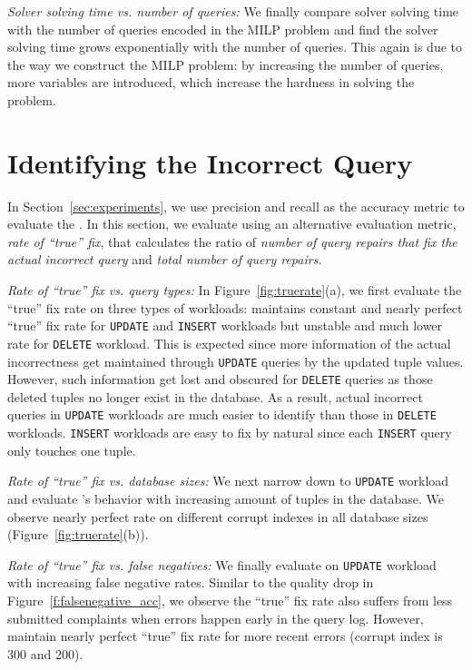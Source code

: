\smallskip
\emph{Solver solving time vs. number of queries: } We finally compare solver solving time with the number of queries encoded in the MILP problem and find the solver solving time grows exponentially with the number of queries. This again is due to the way we construct the MILP problem: by increasing the number of queries, more variables are introduced, which increase the hardness in solving the problem. 

\section{Identifying the Incorrect Query}
\label{app:index}
In Section~\ref{sec:experiments}, we use precision and recall as the accuracy metric to evaluate the \sys. In this section, we evaluate \sys using an alternative evaluation metric, \textit{rate of ``true'' fix}, that calculates the ratio of \textit{number of query repairs that fix the actual incorrect query} and \textit{total number of query repairs}. 

\smallskip
\emph{Rate of ``true'' fix vs. query types: } In Figure~\ref{fig:truerate}(a), we first evaluate the ``true'' fix rate on three types of workloads: \sys maintains constant and nearly perfect ``true'' fix rate for \texttt{UPDATE} and \texttt{INSERT} workloads but unstable and much lower rate for \texttt{DELETE} workload. This is expected since more information of the actual incorrectness get maintained through \texttt{UPDATE} queries by the updated tuple values. However, such information get lost and obscured for \texttt{DELETE} queries as those deleted tuples no longer exist in the database. As a result, actual incorrect queries in \texttt{UPDATE} workloads are much easier to identify than those in \texttt{DELETE} workloads. \texttt{INSERT} workloads are easy to fix by natural since each \texttt{INSERT} query only touches one tuple. 

\smallskip
\emph{Rate of ``true'' fix vs. database sizes: } We next narrow down to \texttt{UPDATE} workload and evaluate \sys's behavior with increasing amount of tuples in the database. We observe nearly perfect rate on different corrupt indexes in all database sizes (Figure~\ref{fig:truerate}(b)). 

\smallskip
\emph{Rate of ``true'' fix vs. false negatives: } We finally evaluate \sys on \texttt{UPDATE} workload with increasing false negative rates. Similar to the quality drop in Figure~\ref{f:falsenegative_acc}, we observe the ``true'' fix rate also suffers from less submitted complaints when errors happen early in the query log. However, \sys maintain nearly perfect ``true'' fix rate for more recent errors (corrupt index is 300 and 200). 

